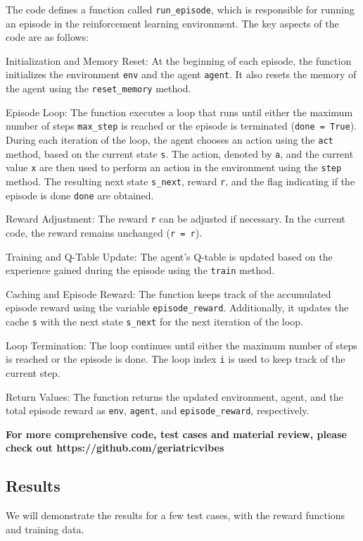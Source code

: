 \documentclass[12pt,a4paper,twoside]{report}
\begin{document}
The code defines a function called \texttt{run\_episode}, which is responsible for running an episode in the reinforcement learning environment. The key aspects of the code are as follows:

Initialization and Memory Reset: At the beginning of each episode, the function initializes the environment \texttt{env} and the agent \texttt{agent}. It also resets the memory of the agent using the \texttt{reset\_memory} method.

Episode Loop: The function executes a loop that runs until either the maximum number of steps \texttt{max\_step} is reached or the episode is terminated (\texttt{done = True}). During each iteration of the loop, the agent chooses an action using the \texttt{act} method, based on the current state \texttt{s}. The action, denoted by \texttt{a}, and the current value \texttt{x} are then used to perform an action in the environment using the \texttt{step} method. The resulting next state \texttt{s\_next}, reward \texttt{r}, and the flag indicating if the episode is done \texttt{done} are obtained.

Reward Adjustment: The reward \texttt{r} can be adjusted if necessary. In the current code, the reward remains unchanged (\texttt{r = r}).

Training and Q-Table Update: The agent's Q-table is updated based on the experience gained during the episode using the \texttt{train} method.

Caching and Episode Reward: The function keeps track of the accumulated episode reward using the variable \texttt{episode\_reward}. Additionally, it updates the cache \texttt{s} with the next state \texttt{s\_next} for the next iteration of the loop.

Loop Termination: The loop continues until either the maximum number of steps is reached or the episode is done. The loop index \texttt{i} is used to keep track of the current step.

Return Values: The function returns the updated environment, agent, and the total episode reward as \texttt{env}, \texttt{agent}, and \texttt{episode\_reward}, respectively.

\textbf{For more comprehensive code, test cases and material review, please check out https://github.com/geriatricvibes}
\newpage
\subsection{Results}
We will demonstrate the results for a few test cases, with the reward functions and training data.
	
\end{document}
